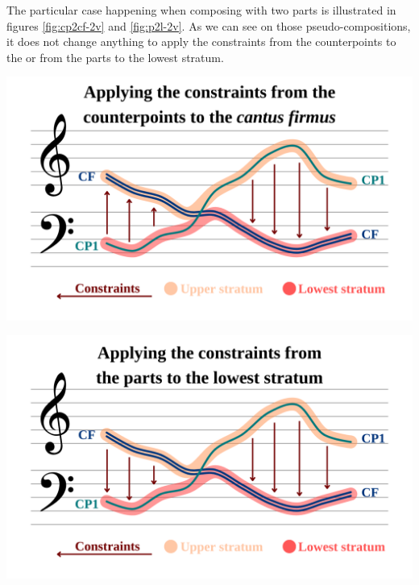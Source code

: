 The particular case happening when composing with two parts is illustrated in figures \ref{fig:cp2cf-2v} and \ref{fig:p2l-2v}. As we can see on those pseudo-compositions, it does not change anything to apply the constraints from the counterpoints to the \cfs or from the parts to the lowest stratum.

\vspace{.5cm}
\begin{minipage}{0.46\textwidth}
    \centering
    \includegraphics[width=\textwidth]{Images/cp2cf-2v.png}
    \label{fig:cp2cf-2v}
    \end{minipage}
    \hfill
    \begin{minipage}{0.46\textwidth}
      \centering
      \includegraphics[width=\textwidth]{Images/p2l-2v.png}
      \label{fig:p2l-2v}
\end{minipage}
\vspace{.5cm}

